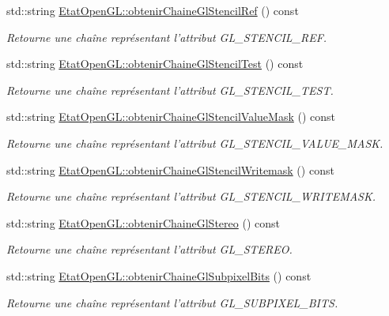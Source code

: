 \begin{DoxyCompactItemize}
std\-::string \hyperlink{group__utilitaire_ga31c961d29726d9daaf4d7cfc78025a6b}{Etat\-Open\-G\-L\-::obtenir\-Chaine\-Gl\-Stencil\-Ref} () const 
\begin{DoxyCompactList}\small\item\em Retourne une chaîne représentant l'attribut G\-L\-\_\-\-S\-T\-E\-N\-C\-I\-L\-\_\-\-R\-E\-F. \end{DoxyCompactList}\item 
std\-::string \hyperlink{group__utilitaire_ga3c3fb4e59ed994063e62893114882ad7}{Etat\-Open\-G\-L\-::obtenir\-Chaine\-Gl\-Stencil\-Test} () const 
\begin{DoxyCompactList}\small\item\em Retourne une chaîne représentant l'attribut G\-L\-\_\-\-S\-T\-E\-N\-C\-I\-L\-\_\-\-T\-E\-S\-T. \end{DoxyCompactList}\item 
std\-::string \hyperlink{group__utilitaire_ga88f72c76847937fa57511a7758f43d43}{Etat\-Open\-G\-L\-::obtenir\-Chaine\-Gl\-Stencil\-Value\-Mask} () const 
\begin{DoxyCompactList}\small\item\em Retourne une chaîne représentant l'attribut G\-L\-\_\-\-S\-T\-E\-N\-C\-I\-L\-\_\-\-V\-A\-L\-U\-E\-\_\-\-M\-A\-S\-K. \end{DoxyCompactList}\item 
std\-::string \hyperlink{group__utilitaire_ga4dbeac5dc5d9ad85a54af632e3f96aac}{Etat\-Open\-G\-L\-::obtenir\-Chaine\-Gl\-Stencil\-Writemask} () const 
\begin{DoxyCompactList}\small\item\em Retourne une chaîne représentant l'attribut G\-L\-\_\-\-S\-T\-E\-N\-C\-I\-L\-\_\-\-W\-R\-I\-T\-E\-M\-A\-S\-K. \end{DoxyCompactList}\item 
std\-::string \hyperlink{group__utilitaire_gadb2e39bc8896bcdd38587b23347df156}{Etat\-Open\-G\-L\-::obtenir\-Chaine\-Gl\-Stereo} () const 
\begin{DoxyCompactList}\small\item\em Retourne une chaîne représentant l'attribut G\-L\-\_\-\-S\-T\-E\-R\-E\-O. \end{DoxyCompactList}\item 
std\-::string \hyperlink{group__utilitaire_ga842fdba84c1a6dc5261e2e694732df1a}{Etat\-Open\-G\-L\-::obtenir\-Chaine\-Gl\-Subpixel\-Bits} () const 
\begin{DoxyCompactList}\small\item\em Retourne une chaîne représentant l'attribut G\-L\-\_\-\-S\-U\-B\-P\-I\-X\-E\-L\-\_\-\-B\-I\-T\-S. \end{DoxyCompactList}\item 

\end{DoxyCompactItemize}
